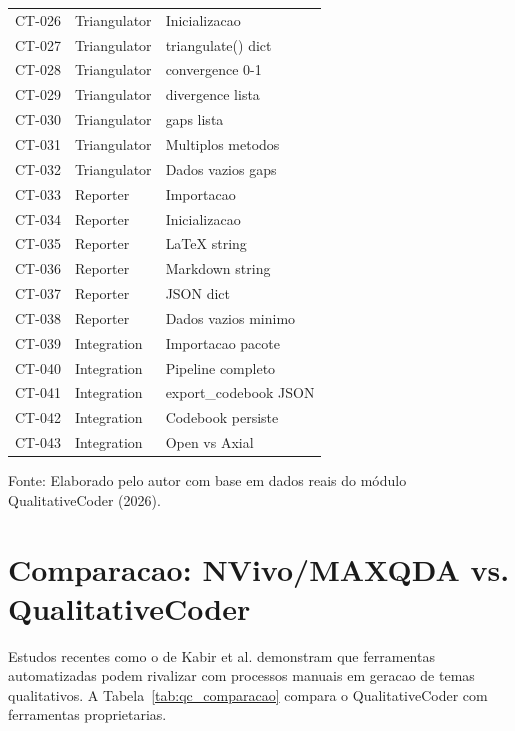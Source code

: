 \begin{table}[htbp]
\begin{tabular}{cll}
        CT-026 & Triangulator & Inicializacao \\
        CT-027 & Triangulator & triangulate() dict \\
        CT-028 & Triangulator & convergence 0-1 \\
        CT-029 & Triangulator & divergence lista \\
        CT-030 & Triangulator & gaps lista \\
        CT-031 & Triangulator & Multiplos metodos \\
        CT-032 & Triangulator & Dados vazios gaps \\
        CT-033 & Reporter & Importacao \\
        CT-034 & Reporter & Inicializacao \\
        CT-035 & Reporter & LaTeX string \\
        CT-036 & Reporter & Markdown string \\
        CT-037 & Reporter & JSON dict \\
        CT-038 & Reporter & Dados vazios minimo \\
        CT-039 & Integration & Importacao pacote \\
        CT-040 & Integration & Pipeline completo \\
        CT-041 & Integration & export\_codebook JSON \\
        CT-042 & Integration & Codebook persiste \\
        CT-043 & Integration & Open vs Axial \\
        \bottomrule
    \end{tabular}
    \par\medskip
    \footnotesize{Fonte: Elaborado pelo autor com base em dados reais do módulo QualitativeCoder (2026).}
\end{table}

\section{Comparacao: NVivo/MAXQDA vs. QualitativeCoder}
\label{sec:qc_comparacao}

Estudos recentes como o de Kabir et al. \cite{KABIR2025} demonstram que ferramentas automatizadas podem rivalizar com processos manuais em geracao de temas qualitativos. A Tabela~\ref{tab:qc_comparacao} compara o QualitativeCoder com ferramentas proprietarias.

